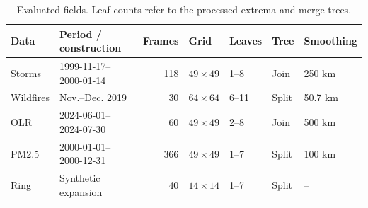 \begin{table}[H]
\caption{Evaluated fields. Leaf counts refer to the processed extrema and merge trees.}\label{tab:data}
\centering\footnotesize\setlength{\tabcolsep}{3pt}
\begin{tabular}{llrllll}\toprule
Data & Period / construction & Frames & Grid & Leaves & Tree & Smoothing\\\midrule
Storms & 1999-11-17--2000-01-14 & 118 & $49\times49$ & 1--8 & Join & 250 km\\
Wildfires & Nov.--Dec. 2019 & 30 & $64\times64$ & 6--11 & Split & 50.7 km\\
OLR & 2024-06-01--2024-07-30 & 60 & $49\times49$ & 2--8 & Join & 500 km\\
PM2.5 & 2000-01-01--2000-12-31 & 366 & $49\times49$ & 1--7 & Split & 100 km\\
Ring & Synthetic expansion & 40 & $14\times14$ & 1--7 & Split & --\\
\bottomrule\end{tabular}
\par{}
\end{table}
